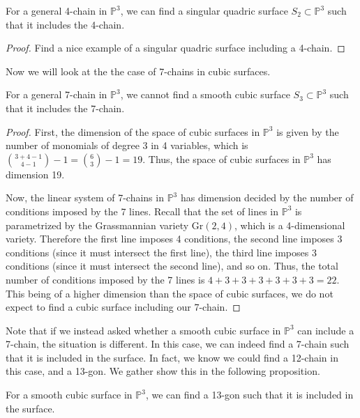 \begin{proposition}
    For a general 4-chain in $\mathbb{P}^3$, we can find a singular quadric surface $ S_2 \subset \mathbb{P}^3$ such that it includes the 4-chain.
\end{proposition}
\begin{proof}
    Find a nice example of a singular quadric surface including a 4-chain.
\end{proof}

Now we will look at the the case of 7-chains in cubic surfaces. 

\begin{proposition}
    For a general 7-chain in $\mathbb{P}^3$, we cannot find a smooth cubic surface $ S_3 \subset \mathbb{P}^3$ such that it includes the 7-chain.
\end{proposition}

\begin{proof}
    First, the dimension of the space of cubic surfaces in $\mathbb{P}^3$ is given by the number of monomials of degree 3 in 4 variables, which is $\binom{3+4-1}{4-1} - 1 = \binom{6}{3} - 1 = 19$. Thus, the space of cubic surfaces in $\mathbb{P}^3$ has dimension 19. 

    Now, the linear system of 7-chains in $\mathbb{P}^3$ has dimension decided by the number of conditions imposed by the 7 lines. Recall that the set of lines in $\mathbb{P}^3$ is parametrized by the Grassmannian variety $\mathrm{Gr}(2,4)$, which is a 4-dimensional variety. Therefore the first line imposes 4 conditions, the second line imposes 3 conditions (since it must intersect the first line), the third line imposes 3 conditions (since it must intersect the second line), and so on. Thus, the total number of conditions imposed by the 7 lines is $4 + 3 + 3 + 3 + 3 + 3 + 3 = 22$. This being of a higher dimension than the space of cubic surfaces, we do not expect to find a cubic surface including our 7-chain.
\end{proof}


Note that if we instead asked whether a smooth cubic surface in $\mathbb{P}^3$ can include a 7-chain, the situation is different. In this case, we can indeed find a 7-chain such that it is included in the surface. In fact, we know we could find a 12-chain in this case, and a 13-gon. We gather show this in the following proposition. 

\begin{proposition}
    For a smooth cubic surface in $\mathbb{P}^3$, we can find a 13-gon such that it is included in the surface.
\end{proposition}

